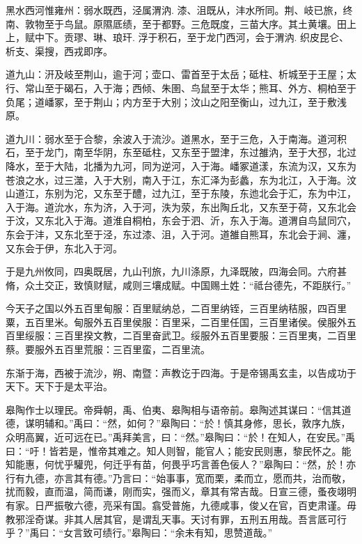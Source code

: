 \documentclass[UTF8,12pt,AutoFakeBold,fontset=fandol]{ctexart}
\begin{document}
	黑水西河惟雍州：弱水既西，泾属渭汭. 漆、沮既从，沣水所同。荆、岐已旅，终南、敦物至于鸟鼠。原隰厎绩，至于都野。三危既度，三苗大序。其土黄壤。田上上，赋中下。贡璆、琳、琅玕. 浮于积石，至于龙门西河，会于渭汭. 织皮昆仑、析支、渠搜，西戎即序。
	
	道九山：汧及岐至荆山，逾于河；壶口、雷首至于太岳；砥柱、析城至于王屋；太行、常山至于碣石，入于海；西倾、朱圉、鸟鼠至于太华；熊耳、外方、桐柏至于负尾；道嶓冢，至于荆山；内方至于大别；汶山之阳至衡山，过九江，至于敷浅原。
	
	道九川：弱水至于合黎，余波入于流沙。道黑水，至于三危，入于南海。道河积石，至于龙门，南至华阴，东至砥柱，又东至于盟津，东过雒汭，至于大邳，北过降水，至于大陆，北播为九河，同为逆河，入于海。嶓冢道漾，东流为汉，又东为苍浪之水，过三澨，入于大别，南入于江，东汇泽为彭蠡，东为北江，入于海。汶山道江，东别为沱，又东至于醴，过九江，至于东陵，东迆北会于汇，东为中江，入于海。道沇水，东为济，入于河，泆为荥，东出陶丘北，又东至于荷，又东北会于汶，又东北入于海。道淮自桐柏，东会于泗、沂，东入于海。道渭自鸟鼠同穴，东会于沣，又东北至于泾，东过漆、沮，入于河。道雒自熊耳，东北会于涧、瀍，又东会于伊，东北入于河。
	
	于是九州攸同，四奥既居，九山刊旅，九川涤原，九泽既陂，四海会同。六府甚脩，众土交正，致慎财赋，咸则三壤成赋。中国赐土姓：“祗台德先，不距朕行。”
	
	今天子之国以外五百里甸服：百里赋纳总，二百里纳铚，三百里纳秸服，四百里粟，五百里米。甸服外五百里侯服：百里采，二百里任国，三百里诸侯。侯服外五百里绥服：三百里揆文教，二百里奋武卫。绥服外五百里要服：三百里夷，二百里蔡。要服外五百里荒服：三百里蛮，二百里流。
	
	东渐于海，西被于流沙，朔、南暨：声教讫于四海。于是帝锡禹玄圭，以告成功于天下。天下于是太平治。
	
	皋陶作士以理民。帝舜朝，禹、伯夷、皋陶相与语帝前。皋陶述其谋曰：“信其道德，谋明辅和。”禹曰：“然，如何？”皋陶曰：“於！慎其身修，思长，敦序九族，众明高翼，近可远在已。”禹拜美言，曰：“然。”皋陶曰：“於！在知人，在安民。”禹曰：“吁！皆若是，惟帝其难之。知人则智，能官人；能安民则惠，黎民怀之。能知能惠，何忧乎驩兜，何迁乎有苗，何畏乎巧言善色佞人？”皋陶曰：“然，於！亦行有九德，亦言其有德。”乃言曰：“始事事，宽而栗，柔而立，愿而共，治而敬，扰而毅，直而温，简而谦，刚而实，强而义，章其有常吉哉。日宣三德，蚤夜翊明有家。日严振敬六德，亮采有国。翕受普施，九德咸事，俊乂在官，百吏肃谨。毋教邪淫奇谋。非其人居其官，是谓乱天事。天讨有罪，五刑五用哉。吾言厎可行乎？”禹曰：“女言致可绩行。”皋陶曰：“余未有知，思赞道哉。”
	
\end{document}
